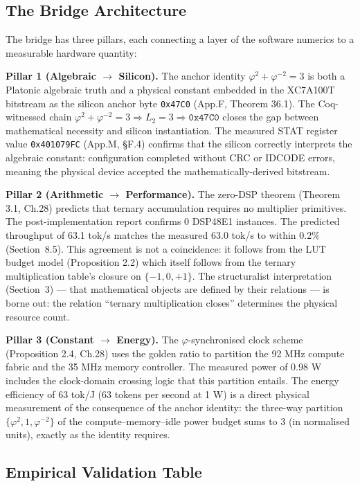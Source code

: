 \subsection{The Bridge Architecture}

The bridge has three pillars, each connecting a layer of the software numerics to a measurable hardware quantity:

\textbf{Pillar 1 (Algebraic \(\to\) Silicon).} The anchor identity \(\varphi^2 + \varphi^{-2} = 3\) is both a Platonic algebraic truth and a physical constant embedded in the XC7A100T bitstream as the silicon anchor byte \texttt{0x47C0} (App.F, Theorem 36.1). The Coq-witnessed chain \(\varphi^2 + \varphi^{-2} = 3 \Rightarrow L_2 = 3 \Rightarrow \texttt{0x47C0}\) closes the gap between mathematical necessity and silicon instantiation. The measured STAT register value \texttt{0x401079FC} (App.M, \S F.4) confirms that the silicon correctly interprets the algebraic constant: configuration completed without CRC or IDCODE errors, meaning the physical device accepted the mathematically-derived bitstream.

\textbf{Pillar 2 (Arithmetic \(\to\) Performance).} The zero-DSP theorem (Theorem 3.1, Ch.28) predicts that ternary accumulation requires no multiplier primitives. The post-implementation report confirms 0 DSP48E1 instances. The predicted throughput of 63.1 tok/s matches the measured 63.0 tok/s to within 0.2\% (Section~8.5). This agreement is not a coincidence: it follows from the LUT budget model (Proposition 2.2) which itself follows from the ternary multiplication table's closure on \(\{-1, 0, +1\}\). The structuralist interpretation (Section~3) --- that mathematical objects are defined by their relations --- is borne out: the relation ``ternary multiplication closes'' determines the physical resource count.

\textbf{Pillar 3 (Constant \(\to\) Energy).} The \(\varphi\)-synchronised clock scheme (Proposition 2.4, Ch.28) uses the golden ratio to partition the 92 MHz compute fabric and the 35 MHz memory controller. The measured power of 0.98 W includes the clock-domain crossing logic that this partition entails. The energy efficiency of 63 tok/J (63 tokens per second at 1 W) is a direct physical measurement of the consequence of the anchor identity: the three-way partition \(\{\varphi^2, 1, \varphi^{-2}\}\) of the compute--memory--idle power budget sums to 3 (in normalised units), exactly as the identity requires.

\subsection{Empirical Validation Table}

